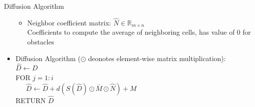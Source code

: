 \documentclass{beamer}
\begin{document}
\begin{frame}{Diffusion Algorithm}
\begin{itemize}
\begin{itemize}
	\item Neighbor coefficient matrix: $\hat N\in \mathbb{R}_{m \times n}$ \\ Coefficients to compute the average of neighboring cells, has value of 0 for obstacles
    \end{itemize}
  \item Diffusion Algorithm ($\odot$ deonotes element-wise matrix multiplication):\\
    $\hat D \leftarrow D$\\
    FOR $j=1:i$\\
    \ \ \ $\hat D \leftarrow \hat D + d (S(\hat D) \odot \bar{M} \odot \hat{N}) + M$ \\
    RETURN $\hat D$
    
    
  \end{itemize}
\end{frame}
\end{document}
